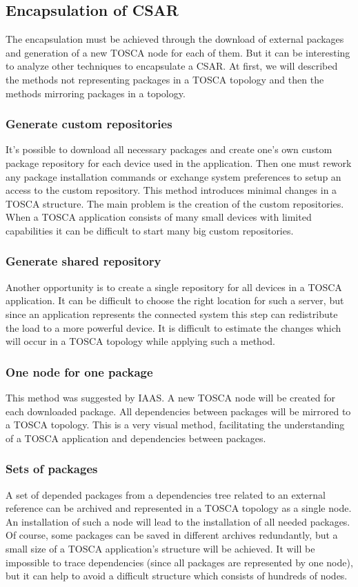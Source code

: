 \subsection{Encapsulation of CSAR}
The encapsulation must be achieved through the download of external packages and generation of a new TOSCA node for each of them. 
But it can be interesting to analyze other techniques to encapsulate a CSAR. 
At first, we will described the methods not representing packages in a TOSCA topology and then the methods mirroring packages in a topology.\\

\subsubsection*{Generate custom repositories}
It's possible to download all necessary packages and create one's own custom package repository for each device used in the application. 
Then one must rework any package installation commands or exchange system preferences to setup an access to the custom repository.
This method introduces minimal changes in a TOSCA structure.
The main problem is the creation of the custom repositories. 
When a TOSCA application consists of many small devices with limited capabilities it can be difficult to start many big custom repositories.

\subsubsection*{Generate shared repository}
Another opportunity is to create a single repository for all devices in a TOSCA application.
It can be difficult to choose the right location for such a server, but since an application represents the connected system this step can redistribute the load to a more powerful device.
It is difficult to estimate the changes which will occur in a TOSCA topology while applying such a method.

\subsubsection*{One node for one package}
This method was suggested by IAAS. 
A new TOSCA node will be created for each downloaded package. 
All dependencies between packages will be mirrored to a TOSCA topology.
This is a very visual method, facilitating the understanding of a TOSCA application and dependencies between packages.

\subsubsection*{Sets of packages}
A set of depended packages from a dependencies tree related to an external reference can be archived and represented in a TOSCA topology as a single node.
An installation of such a node will lead to the installation of all needed packages.
Of course, some packages can be saved in different archives redundantly, but a small size of a TOSCA application's structure will be achieved.
It will be impossible to trace dependencies (since all packages are represented by one node), but it can help to avoid a difficult structure which consists of hundreds of nodes. 


